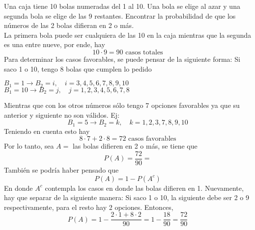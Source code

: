 \item Una caja tiene 10 bolas numeradas del 1 al 10. Una bola se elige al azar y una segunda bola se elige de las 9 restantes. Encontrar la probabilidad de que los números de las 2 bolas difieran en 2 o más.\e\\
    La primera bola puede ser cualquiera de las 10 en la caja mientras que la segunda es una entre nueve, por ende, hay \[10\cdot9=90\text{ casos totales}\]
    Para determinar los casos favorables, se puede pensar de la siguiente forma: Si saco 1 o 10, tengo 8 bolas que cumplen lo pedido
    \begin{center}
        $B_1=1\to B_2=i,\quad i=3,4,5,6,7,8,9,10$\\
        $B_1=10\to B_2=j,\quad j=1,2,3,4,5,6,7,8$ 
    \end{center}
    Mientras que con los otros números sólo tengo 7 opciones favorables ya que su anterior y siguiente no son válidos. Ej:\[B_1=5\to B_2=k,\quad k=1,2,3,7,8,9,10\]
    Teniendo en cuenta esto hay\[8\cdot7+2\cdot8=72\text{ casos favorables}\]
    Por lo tanto, sea $A=$ las bolas difieren en 2 o más, se tiene que\[P(A)=\frac{72}{90}=\]
    También se podría haber pensado que\[P(A)=1-P(A^c)\]
    En donde $A^c$ contempla los casos en donde las bolas difieren en 1. Nuevamente, hay que separar de la siguiente manera: Si saco 1 o 10, la siguiente debe ser 2 o 9 respectivamente, para el resto hay 2 opciones. Entonces,
    \[P(A)=1-\frac{2\cdot1+8\cdot2}{90}=1-\frac{18}{90}=\frac{72}{90}\]